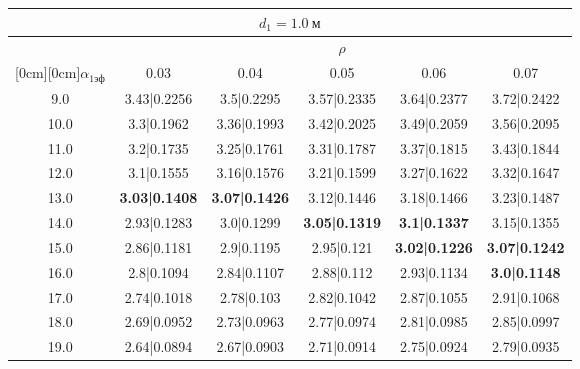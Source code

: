 \documentclass[20pt]{article}
\begin{document}
\begin{center}
\begin{tabular}{c|ccccc}
\hline
	\multicolumn{6}{c}{$d_{1}=1.0 \ м$} \\
\hline
	 & \multicolumn{5}{|c}{$\rho$} \\
	\cline{2-6}
	\raisebox{1.5ex}[0cm][0cm]{$\alpha_{1эф}$} & 0.03 & 0.04 & 0.05 & 0.06 & 0.07\\
\hline
	9.0 & 	3.43|0.2256 & 	3.5|0.2295 & 	3.57|0.2335 & 	3.64|0.2377 & 	3.72|0.2422\\
	10.0 & 	3.3|0.1962 & 	3.36|0.1993 & 	3.42|0.2025 & 	3.49|0.2059 & 	3.56|0.2095\\
	11.0 & 	3.2|0.1735 & 	3.25|0.1761 & 	3.31|0.1787 & 	3.37|0.1815 & 	3.43|0.1844\\
	12.0 & 	3.1|0.1555 & 	3.16|0.1576 & 	3.21|0.1599 & 	3.27|0.1622 & 	3.32|0.1647\\
	13.0 & 	\textbf{3.03|0.1408} & 	\textbf{3.07|0.1426} & 	3.12|0.1446 & 	3.18|0.1466 & 	3.23|0.1487\\
	14.0 & 	2.93|0.1283 & 	3.0|0.1299 & 	\textbf{3.05|0.1319} & 	\textbf{3.1|0.1337} & 	3.15|0.1355\\
	15.0 & 	2.86|0.1181 & 	2.9|0.1195 & 	2.95|0.121 & 	\textbf{3.02|0.1226} & 	\textbf{3.07|0.1242}\\
	16.0 & 	2.8|0.1094 & 	2.84|0.1107 & 	2.88|0.112 & 	2.93|0.1134 & 	\textbf{3.0|0.1148}\\
	17.0 & 	2.74|0.1018 & 	2.78|0.103 & 	2.82|0.1042 & 	2.87|0.1055 & 	2.91|0.1068\\
	18.0 & 	2.69|0.0952 & 	2.73|0.0963 & 	2.77|0.0974 & 	2.81|0.0985 & 	2.85|0.0997\\
	19.0 & 	2.64|0.0894 & 	2.67|0.0903 & 	2.71|0.0914 & 	2.75|0.0924 & 	2.79|0.0935\\
\end{tabular}


\end{center}
\end{document}
